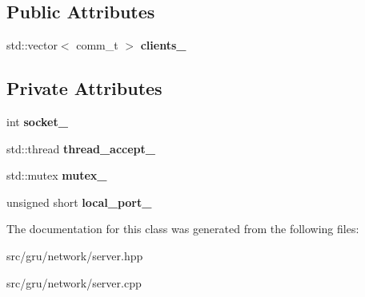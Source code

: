 \subsection*{\-Public \-Attributes}
\begin{DoxyCompactItemize}
\item 
\hypertarget{classgal_1_1network_1_1server_a4de485e44eab83025b8fd34b7b3c6928}{std\-::vector$<$ comm\-\_\-t $>$ {\bfseries clients\-\_\-}}\label{classgal_1_1network_1_1server_a4de485e44eab83025b8fd34b7b3c6928}

\end{DoxyCompactItemize}
\subsection*{\-Private \-Attributes}
\begin{DoxyCompactItemize}
\item 
\hypertarget{classgal_1_1network_1_1server_ab30387fed262865c5b4fdaf31127e03f}{int {\bfseries socket\-\_\-}}\label{classgal_1_1network_1_1server_ab30387fed262865c5b4fdaf31127e03f}

\item 
\hypertarget{classgal_1_1network_1_1server_ac269b4e460b0907bb6c12e400bd35b4f}{std\-::thread {\bfseries thread\-\_\-accept\-\_\-}}\label{classgal_1_1network_1_1server_ac269b4e460b0907bb6c12e400bd35b4f}

\item 
\hypertarget{classgal_1_1network_1_1server_aa431c88e212e3d616be9e94f9701e3ee}{std\-::mutex {\bfseries mutex\-\_\-}}\label{classgal_1_1network_1_1server_aa431c88e212e3d616be9e94f9701e3ee}

\item 
\hypertarget{classgal_1_1network_1_1server_acfcf5712d71ffa9b03b0e53a69d68d77}{unsigned short {\bfseries local\-\_\-port\-\_\-}}\label{classgal_1_1network_1_1server_acfcf5712d71ffa9b03b0e53a69d68d77}

\end{DoxyCompactItemize}


\-The documentation for this class was generated from the following files\-:\begin{DoxyCompactItemize}
\item 
src/gru/network/server.\-hpp\item 
src/gru/network/server.\-cpp\end{DoxyCompactItemize}
